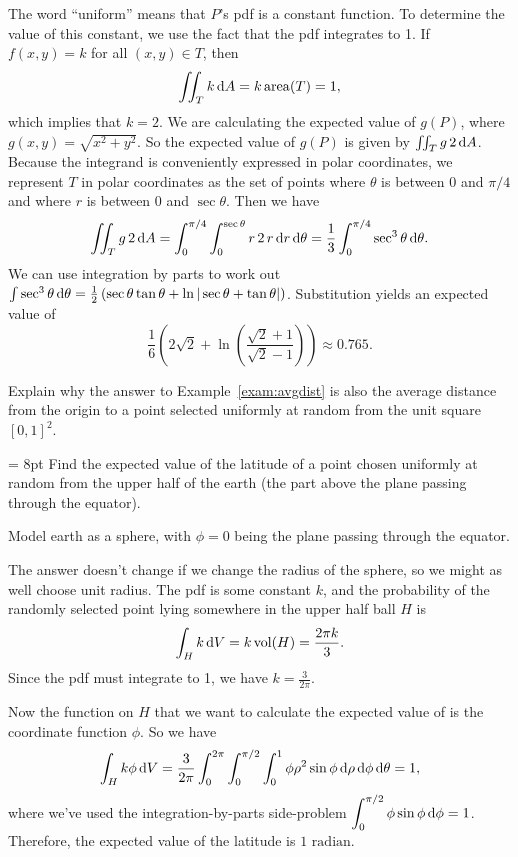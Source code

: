 \documentclass{watsonbook}
\begin{document}
\begin{solution}
  The word ``uniform'' means that $P$'s pdf is a constant function. To
  determine the value of this constant, we use the fact that the pdf
  integrates to 1. If $f(x,y) = k$ for all $(x,y) \in T$, then
  \[
    \iint_T k \, \mathrm{d} A = k\, \mathrm{area}(T) = 1, 
  \]
  which implies that $k=2$. We are calculating the expected
  value of $g(P)$, where $g(x,y) = \sqrt{x^2 + y^2}$. So the expected
  value of $g(P)$ is given by $\iint_T g \, 2\,\mathrm{d} A$. Because the
  integrand is conveniently expressed in polar coordinates, we
  represent $T$ in polar coordinates as the set of points where
  $\theta$ is between $0$ and $\pi/4$ and where $r$ is between 0
  and $\sec \theta$. Then we have
  \[
    \iint_T g \, 2\, \mathrm{d} A = \int_{0}^{\pi/4} \int_0^{\sec \theta} r
    \, 2\, r \, \mathrm{d} r\, \mathrm{d}\theta = \frac{1}{3} \int_{0}^{\pi/4} \sec^3
    \theta \, \mathrm{d}\theta. 
  \]
  We can use integration by parts to work out
  $\int \sec^3 \theta \, \mathrm{d} \theta = \frac{1}{2}\left(\sec \theta \tan
    \theta + \ln|\sec\theta + \tan \theta|\right)$.
  Substitution yields an expected value of
  \[
    \boxed{\frac{1}{6}\left(2\sqrt{2} +
      \ln\left(\frac{\sqrt{2}+1}{\sqrt{2}-1}\right)\right) \approx
    0.765.}
  \]
\end{solution}

\begin{exercise}{}{}
  Explain why the answer to Example~\ref{exam:avgdist} is also the
  average distance from the origin to a point selected uniformly at
  random from the unit square $[0,1]^2$. 
\end{exercise}

\begin{example}{}{} \parskip = 8pt
  Find the expected value of the latitude of a point chosen uniformly
  at random from the upper half of the earth (the part above the plane
  passing through the equator).

  Model earth as a sphere, with $\phi = 0$ being the plane
  passing through the equator. 
\end{example}

\begin{solution}
  The answer doesn't change if we change the radius of the sphere, so
  we might as well choose unit radius. The pdf is some constant $k$,
  and the probability of the randomly selected point lying somewhere
  in the upper half ball $H$ is
  \[
    \int_H k \, \mathrm{d} V = k\, \mathrm{vol}(H) = \frac{2\pi k}{3}. 
  \]
  Since the pdf must integrate to 1, we have $k =
  \tfrac{3}{2\pi}$.

  Now the function on $H$ that we want to calculate the expected value
  of is the coordinate function $\phi$. So we have
  \[
    \int_H k\phi \, \mathrm{d} V = \frac{3}{2\pi} \int_0^{2\pi} \int
    _0^{\pi/2}\int_{0}^{1} \phi \rho^2 \sin \phi \, \mathrm{d} \rho \, \mathrm{d} \phi
    \, \mathrm{d} \theta = 1, 
  \]
  where we've used the integration-by-parts side-problem $\displaystyle{\int_0^{\pi/2} \phi
  \sin \phi \, \mathrm{d}\phi = 1}$. Therefore, the expected value of the
latitude is $\boxed{1 \text{ radian}}$.  
\end{solution}
\end{document}
